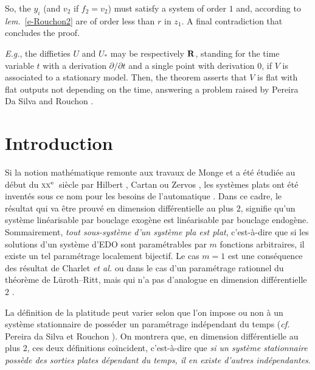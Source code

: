 \documentclass[A4paper, 12pt]{article}
\def\R{{\bf R}}
\def\textem#1{{\em #1\/}}
\begin{document}
So, the $y_{i}$ (and $v_{2}$ if $f_{2}=v_{2}$) must satisfy a system of
order $1$ and, according to \textem{lem.}~\ref{e-Rouchon2} are of
order less than $r$ in $z_{1}$. A final contradiction that concludes
the proof.
\smallskip

\textit{E.g.}, the diffieties $U$ and $U_{\ast}$ may be respectively
$\R$, standing for the time variable $t$ with a derivation
$\partial/\partial t$ and  a single point with derivation $0$, if $V$
is associated to a stationary model. Then, the theorem asserts that
$V$ is flat with flat outputs not depending on the time, answering a
problem raised by Pereira Da Silva and Rouchon \cite{PereiraRouchon2004}. 



\section*{Introduction}
\label{intro}

\noindent Si la notion mathématique remonte aux travaux de Monge
\cite{Monge1787} et a été étudiée au début du \textsc{xx}$^{\rm
  e}$~siècle par Hilbert \cite{Hilbert1912}, Cartan \cite{Cartan1915}
ou Zervos \cite{Zervos1932}, les systèmes plats ont été inventés sous
ce nom pour les besoins de l'automatique
\cite{fliess,fliess3,Levine2009}. Dans ce cadre, le résultat qui va
être prouvé en dimension différentielle au plus $2$, signifie qu'un
système linéarisable par bouclage exogène est linéarisable par
bouclage endogène. Sommairement, \textem{tout sous-système d'un
système pla est plat}, c'est-à-dire que si les solutions d'un
système d'EDO sont paramétrables par $m$ fonctions arbitraires, il
existe un tel paramétrage localement bijectif. Le cas $m=1$ est une
conséquence des résultat de Charlet \textit{et al.} \cite{Charlet1989}
ou dans le cas d'un paramétrage rationnel du théorème de Lüroth--Ritt,
mais qui n'a pas d'analogue en dimension différentielle
$2$ \cite{Ollivier1998}.


La définition de la platitude peut varier selon que l'on impose ou non
à un système stationnaire de posséder un paramétrage indépendant du
temps (\textit{cf.} Pereira da Silva et Rouchon
\cite{PereiraRouchon2004}). On montrera que, en dimension
différentielle au plus $2$, ces deux définitions coïncident,
c'est-à-dire que \textem{si un système stationnaire possède des sorties plates
dépendant du temps, il en existe d'autres indépendantes}.
\end{document}
